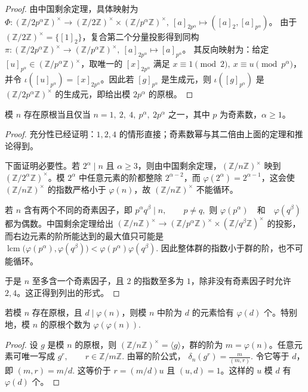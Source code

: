 \documentclass[oneside]{AJbook}
\newcommand{\Z}{\mathbb Z}
\newcommand{\U}[1]{(\Z/#1\Z)^\times}
\begin{document}
\begin{proof}
由中国剩余定理，具体映射为
\(\Phi:\U{2p^\alpha}\to \U{2}\times\U{p^\alpha},\ [a]_{2p^\alpha}\mapsto ([a]_2,[a]_{p^\alpha})\)。
由于 \(\U{2}=\{[1]_2\}\)，复合第二个分量投影得到同构
\(\pi:\U{2p^\alpha}\to \U{p^\alpha},\ [a]_{2p^\alpha}\mapsto [a]_{p^\alpha}\)。
其反向映射为：给定 \([u]_{p^\alpha}\in\U{p^\alpha}\)，取唯一的 \([x]_{2p^\alpha}\) 满足
\(x\equiv 1\pmod 2,\ x\equiv u\pmod {p^\alpha}\)，并令
\(\iota([u]_{p^\alpha})=[x]_{2p^\alpha}\)。因此若 \([g]_{p^\alpha}\) 是生成元，则 \(\iota([g]_{p^\alpha})\) 是 \(\U{2p^\alpha}\) 的生成元，即给出模 \(2p^\alpha\) 的原根。
\end{proof}

\begin{theorem}[原根存在的完全判别]
模 $n$ 存在原根当且仅当
\(
  n=1,\ 2,\ 4,\ p^\alpha,\ 2p^\alpha
\)
之一，其中 $p$ 为奇素数，$\alpha\ge 1$。
\end{theorem}

\begin{proof}
充分性已经证明：$1,2,4$ 的情形直接；奇素数幂与其二倍由上面的定理和推论得到。

下面证明必要性。若 $2^\alpha\mid n$ 且 $\alpha\ge 3$，则由中国剩余定理，$\U n$ 映到 $\U{2^\alpha}$。模
$2^\alpha$ 中任意元素的阶都整除 $2^{\alpha-2}$，而 $\varphi(2^\alpha)=2^{\alpha-1}$，这会使 $\U n$ 的指数严格小于
$\varphi(n)$，故 $\U n$ 不能循环。

若 $n$ 含有两个不同的奇素因子，即
\(
  p^\alpha q^\beta\mid n,\qquad p\ne q,
\)
则
\(
  \varphi(p^\alpha)\quad\text{和}\quad \varphi(q^\beta)
\)
都为偶数。中国剩余定理给出
\(
  \U n
  \longrightarrow
  \U{p^\alpha}\times \U{q^\beta}
\)
的投影，而右边元素的阶所能达到的最大值只可能是
\(
  \operatorname{lcm}\bigl(\varphi(p^\alpha),\varphi(q^\beta)\bigr)
  <
  \varphi(p^\alpha)\varphi(q^\beta).
\)
因此整体群的指数小于群的阶，也不可能循环。

于是 $n$ 至多含一个奇素因子，且 $2$ 的指数至多为 $1$，除非没有奇素因子时允许 $2,4$。这正得到列出的形式。
\end{proof}

\begin{theorem}[循环情形中给定阶的元素个数]
若模 $n$ 存在原根，且 $d\mid \varphi(n)$，则模 $n$ 中阶为 $d$ 的元素恰有
\(
  \varphi(d)
\)
个。特别地，模 $n$ 的原根个数为
\(
  \varphi(\varphi(n)).
\)
\end{theorem}

\begin{proof}
设 $g$ 是模 $n$ 的原根，则 $\U n=\langle g\rangle$，群的阶为 $m=\varphi(n)$。任意元素可唯一写成
\(
  g^r,\qquad r\in \Z/m\Z.
\)
由幂的阶公式，
\(
  \delta_n(g^r)=\frac{m}{(m,r)}.
\)
令它等于 $d$，即
\(
  (m,r)=m/d.
\)
这等价于 $r=(m/d)u$ 且 $(u,d)=1$。这样的 $u$ 模 $d$ 有 $\varphi(d)$ 个。
\end{proof}
\end{document}
